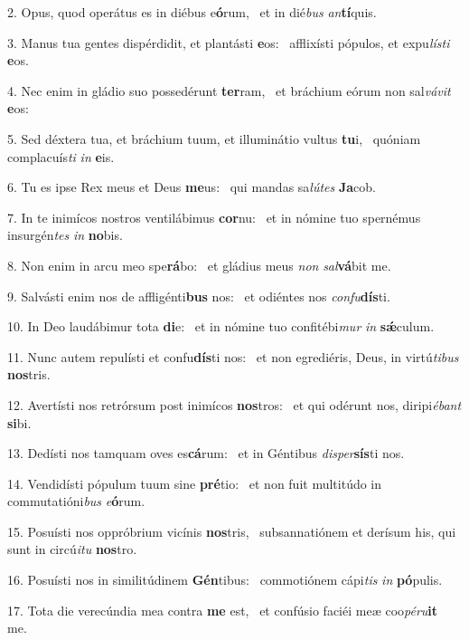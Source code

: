 2. Opus, quod operátus es in diébus e\textbf{ó}rum, \ast\  et in dié\textit{bus} \textit{an}\textbf{tí}quis.\

3. Manus tua gentes dispérdidit, et plantásti \textbf{e}os: \ast\  afflixísti pópulos, et expu\textit{lís}\textit{ti} \textbf{e}os.\

4. Nec enim in gládio suo possedérunt \textbf{ter}ram, \ast\  et bráchium eórum non sal\textit{vá}\textit{vit} \textbf{e}os:\

5. Sed déxtera tua, et bráchium tuum, et illuminátio vultus \textbf{tu}i, \ast\  quóniam complacuís\textit{ti} \textit{in} \textbf{e}is.\

6. Tu es ipse Rex meus et Deus \textbf{me}us: \ast\  qui mandas sa\textit{lú}\textit{tes} \textbf{Ja}cob.\

7. In te inimícos nostros ventilábimus \textbf{cor}nu: \ast\  et in nómine tuo spernémus insurgén\textit{tes} \textit{in} \textbf{no}bis.\

8. Non enim in arcu meo spe\textbf{rá}bo: \ast\  et gládius meus \textit{non} \textit{sal}\textbf{vá}bit me.\

9. Salvásti enim nos de affligénti\textbf{bus} nos: \ast\  et odiéntes nos \textit{con}\textit{fu}\textbf{dís}ti.\

10. In Deo laudábimur tota \textbf{di}e: \ast\  et in nómine tuo confitébi\textit{mur} \textit{in} \textbf{sǽ}culum.\

11. Nunc autem repulísti et confu\textbf{dís}ti nos: \ast\  et non egrediéris, Deus, in virtú\textit{ti}\textit{bus} \textbf{nos}tris.\

12. Avertísti nos retrórsum post inimícos \textbf{nos}tros: \ast\  et qui odérunt nos, diripi\textit{é}\textit{bant} \textbf{si}bi.\

13. Dedísti nos tamquam oves es\textbf{cá}rum: \ast\  et in Géntibus \textit{di}\textit{sper}\textbf{sís}ti nos.\

14. Vendidísti pópulum tuum sine \textbf{pré}tio: \ast\  et non fuit multitúdo in commutatióni\textit{bus} \textit{e}\textbf{ó}rum.\

15. Posuísti nos oppróbrium vicínis \textbf{nos}tris, \ast\  subsannatiónem et derísum his, qui sunt in circú\textit{i}\textit{tu} \textbf{nos}tro.\

16. Posuísti nos in similitúdinem \textbf{Gén}tibus: \ast\  commotiónem cápi\textit{tis} \textit{in} \textbf{pó}pulis.\

17. Tota die verecúndia mea contra \textbf{me} est, \ast\  et confúsio faciéi meæ coo\textit{pé}\textit{ru}\textbf{it} me.\

